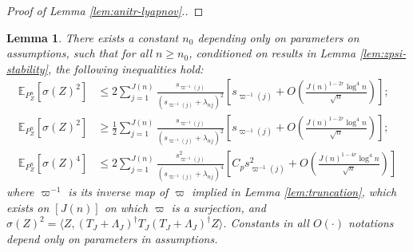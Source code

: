 \documentclass[11pt,a4paper]{article}
\renewcommand{\hat}{\widehat}
\theoremstyle{definition}
\theoremstyle{plain}
\newtheorem{lemma}{Lemma}[section]
\theoremstyle{remark}
\newcommand{\ud}{\mathrm d}
\begin{document}
\begin{proof}[Proof of Lemma \ref{lem:anitr-lyapnov}.]
\end{proof}

\begin{lemma}
There exists a constant $n_0$ depending only on parameters on assumptions, such that for all $n\geq n_0$,
conditioned on results in Lemma \ref{lem:zpsi-stability}, the following inequalities hold:
\begin{align*}
\mathbb E_{P_Z^n}[\sigma(Z)^2] &\leq 2\sum_{j=1}^{J(n)}\frac{s_{\varpi^{-1}(j)}}{(s_{\varpi^{-1}(j)}+\lambda_{nj})^2}\left[s_{\varpi^{-1}(j)} + O\left(\frac{J(n)^{1-2r}\log^4 n}{\sqrt{n}}\right)\right];\\
\mathbb E_{P_Z^n}[\sigma(Z)^2] &\geq \frac{1}{2}\sum_{j=1}^{J(n)}\frac{s_{\varpi^{-1}(j)}}{(s_{\varpi^{-1}(j)}+\lambda_{nj})^2}\left[s_{\varpi^{-1}(j)} + O\left(\frac{J(n)^{1-2r}\log^4 n}{\sqrt{n}}\right)\right];\\
\mathbb E_{P_Z^n}[\sigma(Z)^4] &\leq 2\sum_{j=1}^{J(n)}\frac{s_{\varpi^{-1}(j)}^2}{(s_{\varpi^{-1}(j)}+\lambda_{nj})^4}\left[C_p s_{\varpi^{-1}(j)}^2 + O\left(\frac{J(n)^{1-4r}\log^4 n}{\sqrt{n}}\right)\right]
\end{align*}
where $\varpi^{-1}$ is its inverse map of $\varpi$ implied in Lemma \ref{lem:truncation}, which exists on $[J(n)]$ on which $\varpi$ is a surjection,
and $\sigma(Z)^2 = \langle Z, (T_J+\Lambda_J)^\dagger T_J(T_J+\Lambda_J)^\dagger Z\rangle$.
Constants in all $O(\cdot)$ notations depend only on parameters in assumptions.
\label{lem:variance-stability}
\end{lemma}
\end{document}

